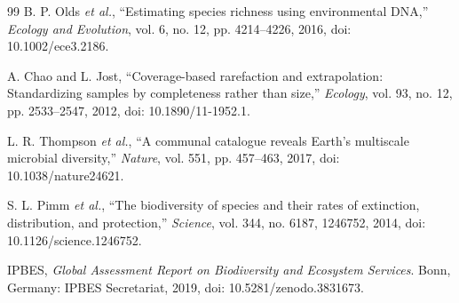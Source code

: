 \documentclass[conference]{IEEEtran}
\begin{document}
\begin{thebibliography}{99}
B. P. Olds \emph{et al.}, ``Estimating species richness using environmental DNA,'' \emph{Ecology and Evolution}, vol. 6, no. 12, pp. 4214--4226, 2016, doi: 10.1002/ece3.2186.

A. Chao and L. Jost, ``Coverage-based rarefaction and extrapolation: Standardizing samples by completeness rather than size,'' \emph{Ecology}, vol. 93, no. 12, pp. 2533--2547, 2012, doi: 10.1890/11-1952.1.

L. R. Thompson \emph{et al.}, ``A communal catalogue reveals Earth's multiscale microbial diversity,'' \emph{Nature}, vol. 551, pp. 457--463, 2017, doi: 10.1038/nature24621.

S. L. Pimm \emph{et al.}, ``The biodiversity of species and their rates of extinction, distribution, and protection,'' \emph{Science}, vol. 344, no. 6187, 1246752, 2014, doi: 10.1126/science.1246752.

IPBES, \emph{Global Assessment Report on Biodiversity and Ecosystem Services}. Bonn, Germany: IPBES Secretariat, 2019, doi: 10.5281/zenodo.3831673.

\end{thebibliography}
\end{document}
